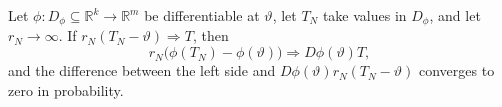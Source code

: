 Let \(\phi:D_\phi\subseteq\mathbb R^k\to\mathbb R^m\) be differentiable at
\(\vartheta\), let \(T_N\) take values in \(D_\phi\), and let
\(r_N\to\infty\).  If \(r_N(T_N-\vartheta)\Rightarrow T\), then
\[
r_N\bigl(\phi(T_N)-\phi(\vartheta)\bigr)
\Rightarrow D\phi(\vartheta)T,
\]
and the difference between the left side and
\(D\phi(\vartheta)r_N(T_N-\vartheta)\) converges to zero in probability.